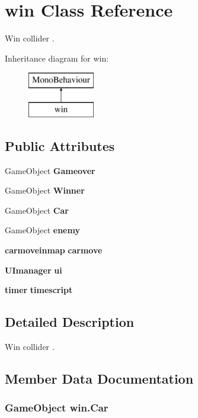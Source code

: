 \section{win Class Reference}
\label{classwin}


Win collider .  


Inheritance diagram for win\+:\begin{figure}[H]
\begin{center}
\leavevmode
\includegraphics[height=2.000000cm]{classwin}
\end{center}
\end{figure}
\subsection*{Public Attributes}
\begin{DoxyCompactItemize}
\item 
Game\+Object {\bf Gameover}
\item 
Game\+Object {\bf Winner}
\item 
Game\+Object {\bf Car}
\item 
Game\+Object {\bf enemy}
\item 
{\bf carmoveinmap} {\bf carmove}
\item 
{\bf U\+Imanager} {\bf ui}
\item 
{\bf timer} {\bf timescript}
\end{DoxyCompactItemize}


\subsection{Detailed Description}
Win collider . 



\subsection{Member Data Documentation}
\subsubsection[{Car}]{\setlength{\rightskip}{0pt plus 5cm}Game\+Object win.\+Car}\label{classwin_a5ce3f23c5b9ddc7ca7201367ef5acb70}
